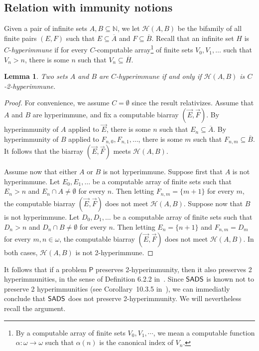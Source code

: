 \documentclass{amsart}
\newtheorem{lemma}[theorem]{Lemma}
\theoremstyle{definition}
\theoremstyle{remark}
\numberwithin{equation}{section}
\theoremstyle{noparens}
\def\propertyL{2-hyperimmunity}
\def\hyper{2-hyperimmune}
\newcommand{\Nb}{\mathbb{N}}
\newcommand{\Psf}{\mathsf{P}}
\newcommand{\Hcal}{\mathcal{H}}
\newcommand{\s}[1]{\ensuremath{\sf{#1}}}
\DeclareMathOperator{\sads}{\s{SADS}}
\begin{document}
\subsection{Relation with immunity notions}\label{subsect:double-immunity-related}

Given a pair of infinite sets $A, B \subseteq \Nb$,
we let $\Hcal(A,B)$ be the bifamily of all finite  pairs $(E, F)$
such that $E \subseteq \overline{A}$ and $F \subseteq \overline{B}$.
Recall that an infinite set $H$ is $C$-\emph{hyperimmune} if
for every $C$-computable array\footnote{By a computable array
of finite sets $V_0,V_1,\cdots$, we mean a computable function $\alpha:\omega\rightarrow \omega$
such that $\alpha(n)$ is the canonical index of $V_n$.} of finite  sets $V_0, V_1, \dots$
such that $V_n > n$, there is some $n$ such that $V_n \subseteq \overline{H}$.

\begin{lemma}\label{lem:hyper-bifamily}
Two sets $A$ and $B$ are $C$-hyperimmune if and only if $\Hcal(A, B)$ is $C$-\hyper.
\end{lemma}
\begin{proof}
For convenience, we assume $C=\emptyset$
since the result relativizes.
Assume that $A$ and $B$ are hyperimmune,
and fix a computable biarray $(\vec{E}, \vec{F})$.
By hyperimmunity of $A$ applied to $\vec{E}$, there is some $n$ such that $E_n \subseteq \overline{A}$.
By hyperimmunity of $B$ applied to $F_{n,0}, F_{n,1}, \dots$, there is some $m$ such that
$F_{n,m} \subseteq \overline{B}$. It follows that the biarray $(\vec{E}, \vec{F})$ meets $\Hcal(A,B)$.

Assume now that either $A$ or $B$ is not hyperimmune.
Suppose first that $A$ is not hyperimmune. Let $E_0, E_1, \dots$ be a computable array of finite  sets
such that $E_n > n$ and $E_n \cap A \neq \emptyset$ for every $n$.
Then letting $F_{n,m} = \{m+1\}$ for every $m$, the computable biarray $(\vec{E}, \vec{F})$
does not meet $\Hcal(A, B)$.
Suppose now that $B$ is not hyperimmune.
Let $D_0, D_1, \dots$ be a computable array of finite sets
such that $D_n > n$ and $D_n \cap B \neq \emptyset$ for every $n$.
Then letting $E_n = \{n+1\}$ and $F_{n,m} = D_m$ for every $m, n \in \omega$,
the computable biarray $(\vec{E}, \vec{F})$
does not meet $\Hcal(A, B)$. In both cases, $\Hcal(A,B)$ is not  \hyper.
\end{proof}

It follows that if a problem $\Psf$ preserves \propertyL,
then it also preserves 2 hyperimmunities, in the sense of
Definition 6.2.2 in~\cite{Patey2016reverse}. Since $\sads$
is known not to preserve 2 hyperimmunities (see Corollary~10.3.5 in~\cite{Patey2016reverse}),
we can immediatly conclude that $\sads$ does not preserve \propertyL.
We will nevertheless recall the argument.
\end{document}
